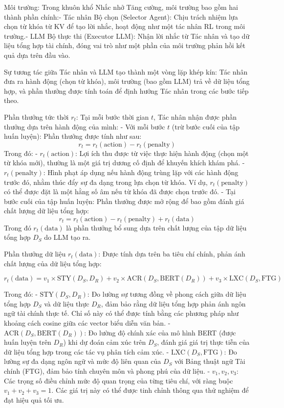 \documentclass[a4paper,10pt]{article}
\begin{document}
Môi trường: Trong khuôn khổ Nhắc nhở Tăng cường, môi trường bao gồm hai thành phần chính:- Tác nhân Bộ chọn (Selector Agent): Chịu trách nhiệm lựa chọn từ khóa từ KV để tạo lời nhắc, hoạt động như một tác nhân RL trong môi trường.- LLM Bộ thực thi (Executor LLM): Nhận lời nhắc từ Tác nhân và tạo dữ liệu tổng hợp tài chính, đóng vai trò như một phần của môi trường phản hồi kết quả dựa trên đầu vào.

Sự tương tác giữa Tác nhân và LLM tạo thành một vòng lặp khép kín: Tác nhân đưa ra hành động (chọn từ khóa), môi trường (bao gồm LLM) trả về dữ liệu tổng hợp, và phần thưởng được tính toán để định hướng Tác nhân trong các bước tiếp theo.

Phần thưởng tức thời \(r_t\): Tại mỗi bước thời gian \(t\), Tác nhân nhận được phần thưởng dựa trên hành động của mình:
- Với mỗi bước \(t\) (trừ bước cuối của tập huấn luyện): Phần thưởng được tính như sau:
  \[
  r_t = r_t(\text{action}) - r_t(\text{penalty})
  \]
  Trong đó:
  - \(r_t(\text{action})\): Lợi ích thu được từ việc thực hiện hành động (chọn một từ khóa mới), thường là một giá trị dương cố định để khuyến khích khám phá.
  - \(r_t(\text{penalty})\): Hình phạt áp dụng nếu hành động trùng lặp với các hành động trước đó, nhằm thúc đẩy sự đa dạng trong lựa chọn từ khóa. Ví dụ, \(r_t(\text{penalty})\) có thể được đặt là một hằng số âm nếu từ khóa đã được chọn trước đó.
- Tại bước cuối của tập huấn luyện: Phần thưởng được mở rộng để bao gồm đánh giá chất lượng dữ liệu tổng hợp:
  \[
  r_t = r_t(\text{action}) - r_t(\text{penalty}) + r_t(\text{data})
  \]
  Trong đó \(r_t(\text{data})\) là phần thưởng bổ sung dựa trên chất lượng của tập dữ liệu tổng hợp \(D_S\) do LLM tạo ra.

Phần thưởng dữ liệu \(r_t(\text{data})\): Được tính dựa trên ba tiêu chí chính, phản ánh chất lượng của dữ liệu tổng hợp:

\[
r_t(\text{data}) = v_1 \times \text{STY}(D_S, D_R) + v_2 \times \text{ACR}(D_S, \text{BERT}(D_R)) + v_3 \times \text{LXC}(D_S, \text{FTG})
\]

Trong đó:
- \(\text{STY}(D_S, D_R)\): Đo lường sự tương đồng về phong cách giữa dữ liệu tổng hợp \(D_S\) và dữ liệu thực \(D_R\), đảm bảo rằng dữ liệu tổng hợp phản ánh ngôn ngữ tài chính thực tế. Chỉ số này có thể được tính bằng các phương pháp như khoảng cách cosine giữa các vector biểu diễn văn bản.
- \(\text{ACR}(D_S, \text{BERT}(D_R))\): Đo lường độ chính xác của mô hình BERT (được huấn luyện trên \(D_R\)) khi dự đoán cảm xúc trên \(D_S\), đánh giá giá trị thực tiễn của dữ liệu tổng hợp trong các tác vụ phân tích cảm xúc.
- \(\text{LXC}(D_S, \text{FTG})\): Đo lường sự đa dạng ngôn ngữ và mức độ liên quan của \(D_S\) với Bảng thuật ngữ Tài chính (FTG), đảm bảo tính chuyên môn và phong phú của dữ liệu.
- \(v_1, v_2, v_3\): Các trọng số điều chỉnh mức độ quan trọng của từng tiêu chí, với ràng buộc \(v_1 + v_2 + v_3 = 1\). Các giá trị này có thể được tinh chỉnh thông qua thử nghiệm để đạt hiệu quả tối ưu.
\end{document}
